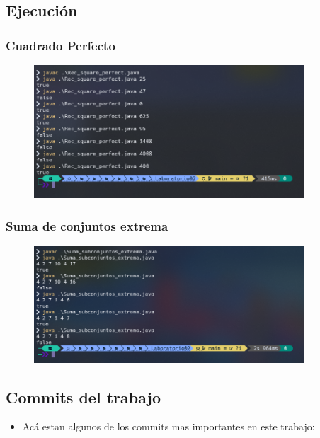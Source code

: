 \documentclass{article}
\begin{document}
\subsection{Ejecución}
\subsubsection{Cuadrado Perfecto}

\begin{figure}[H]
	\centering
	\includegraphics[width=0.9\textwidth,keepaspectratio]{img/ejec_cuadrado.png}
\end{figure}

\subsubsection{Suma de conjuntos extrema}

\begin{figure}[H]
	\centering
	\includegraphics[width=0.9\textwidth,keepaspectratio]{img/ejec_suma.png}
\end{figure}


	\subsection{Commits del trabajo}
	\begin{itemize}	
		\item Acá estan algunos de los commits mas importantes en este trabajo:
	\end{itemize}	
	
\end{document}
